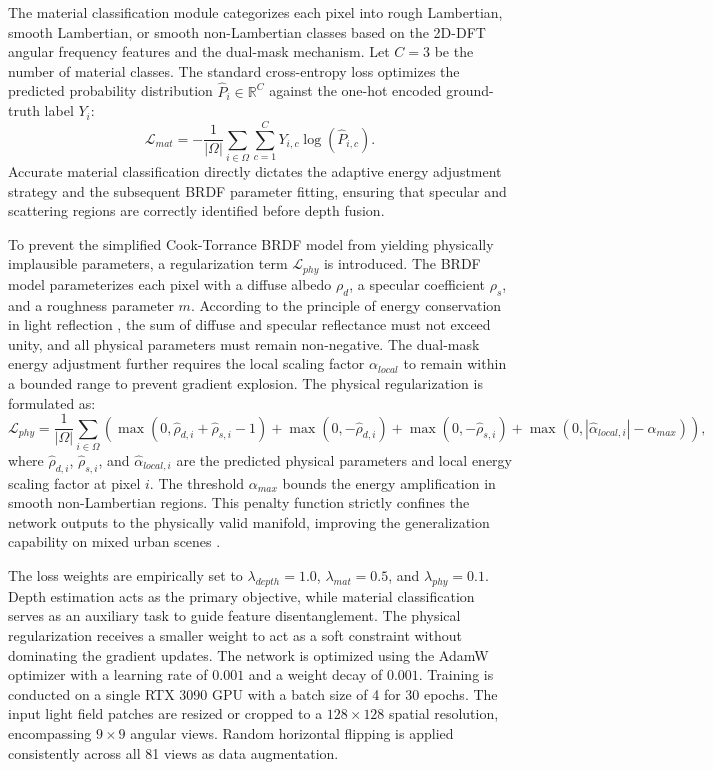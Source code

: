 \documentclass[lettersize,journal]{IEEEtran}
\begin{document}
The material classification module categorizes each pixel into rough Lambertian, smooth Lambertian, or smooth non-Lambertian classes based on the 2D-DFT angular frequency features and the dual-mask mechanism. Let $C=3$ be the number of material classes. The standard cross-entropy loss optimizes the predicted probability distribution $\hat{P}_i \in \mathbb{R}^C$ against the one-hot encoded ground-truth label $Y_i$:
\begin{equation}
    \mathcal{L}_{mat} = - \frac{1}{|\Omega|} \sum_{i \in \Omega} \sum_{c=1}^{C} Y_{i,c} \log(\hat{P}_{i,c}).
\end{equation}
Accurate material classification directly dictates the adaptive energy adjustment strategy and the subsequent BRDF parameter fitting, ensuring that specular and scattering regions are correctly identified before depth fusion.

To prevent the simplified Cook-Torrance BRDF model from yielding physically implausible parameters, a regularization term $\mathcal{L}_{phy}$ is introduced. The BRDF model parameterizes each pixel with a diffuse albedo $\rho_d$, a specular coefficient $\rho_s$, and a roughness parameter $m$. According to the principle of energy conservation in light reflection \cite{blinn1977}, the sum of diffuse and specular reflectance must not exceed unity, and all physical parameters must remain non-negative. The dual-mask energy adjustment further requires the local scaling factor $\alpha_{local}$ to remain within a bounded range to prevent gradient explosion. The physical regularization is formulated as:
\begin{equation}
    \mathcal{L}_{phy} = \frac{1}{|\Omega|} \sum_{i \in \Omega} \left( \max(0, \hat{\rho}_{d,i} + \hat{\rho}_{s,i} - 1) + \max(0, -\hat{\rho}_{d,i}) + \max(0, -\hat{\rho}_{s,i}) + \max(0, |\hat{\alpha}_{local, i}| - \alpha_{max}) \right),
\end{equation}
where $\hat{\rho}_{d,i}$, $\hat{\rho}_{s,i}$, and $\hat{\alpha}_{local, i}$ are the predicted physical parameters and local energy scaling factor at pixel $i$. The threshold $\alpha_{max}$ bounds the energy amplification in smooth non-Lambertian regions. This penalty function strictly confines the network outputs to the physically valid manifold, improving the generalization capability on mixed urban scenes \cite{zhang2023}.

The loss weights are empirically set to $\lambda_{depth} = 1.0$, $\lambda_{mat} = 0.5$, and $\lambda_{phy} = 0.1$. Depth estimation acts as the primary objective, while material classification serves as an auxiliary task to guide feature disentanglement. The physical regularization receives a smaller weight to act as a soft constraint without dominating the gradient updates. The network is optimized using the AdamW optimizer with a learning rate of $0.001$ and a weight decay of $0.001$. Training is conducted on a single RTX 3090 GPU with a batch size of 4 for 30 epochs. The input light field patches are resized or cropped to a $128 \times 128$ spatial resolution, encompassing $9 \times 9$ angular views. Random horizontal flipping is applied consistently across all 81 views as data augmentation.
\end{document}
